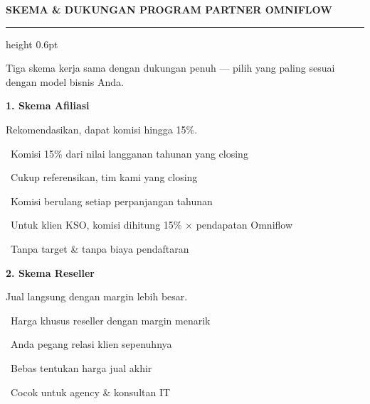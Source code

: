 \documentclass[a4paper]{article}
\newcommand{\sectiontitle}[1]{%
    \vspace{10pt}%
    {\fontsize{13}{16}\selectfont\bfseries\color{BlueDark} #1}\par\vspace{3pt}%
    {\color{BluePrimary}\hrule height 0.6pt}\par\vspace{8pt}%
}
\begin{document}
\setlength{\parskip}{2pt}

\sectiontitle{SKEMA \& DUKUNGAN PROGRAM PARTNER OMNIFLOW}

{\fontsize{9.5}{13}\selectfont\color{TextLight}
Tiga skema kerja sama dengan dukungan penuh --- pilih yang paling sesuai dengan model bisnis Anda.}

\vspace{6pt}

\noindent
\begin{minipage}[t]{0.485\textwidth}
    \colorbox{BluePrimary}{%
        \begin{minipage}{\dimexpr\textwidth-2\fboxsep\relax}
            {\fontsize{10}{13}\selectfont\bfseries\color{White} 1. Skema Afiliasi}
        \end{minipage}}\par
    \vspace{4pt}
    {\fontsize{9}{12}\selectfont\color{TextDark}%
    Rekomendasikan, dapat komisi hingga 15\%.\par\vspace{3pt}
    \textbullet\ Komisi 15\% dari nilai langganan tahunan yang closing\par\vspace{2pt}%
    \textbullet\ Cukup referensikan, tim kami yang closing\par\vspace{2pt}%
    \textbullet\ Komisi berulang setiap perpanjangan tahunan\par\vspace{2pt}%
    \textbullet\ Untuk klien KSO, komisi dihitung 15\% × pendapatan Omniflow\par\vspace{2pt}%
    \textbullet\ Tanpa target \& tanpa biaya pendaftaran}%
\end{minipage}%
\hfill
\begin{minipage}[t]{0.485\textwidth}
    \colorbox{EmeraldPrimary}{%
        \begin{minipage}{\dimexpr\textwidth-2\fboxsep\relax}
            {\fontsize{10}{13}\selectfont\bfseries\color{White} 2. Skema Reseller}
        \end{minipage}}\par
    \vspace{4pt}
    {\fontsize{9}{12}\selectfont\color{TextDark}%
    Jual langsung dengan margin lebih besar.\par\vspace{3pt}
    \textbullet\ Harga khusus reseller dengan margin menarik\par\vspace{2pt}%
    \textbullet\ Anda pegang relasi klien sepenuhnya\par\vspace{2pt}%
    \textbullet\ Bebas tentukan harga jual akhir\par\vspace{2pt}%
    \textbullet\ Cocok untuk agency \& konsultan IT}%
\end{minipage}
\end{document}

